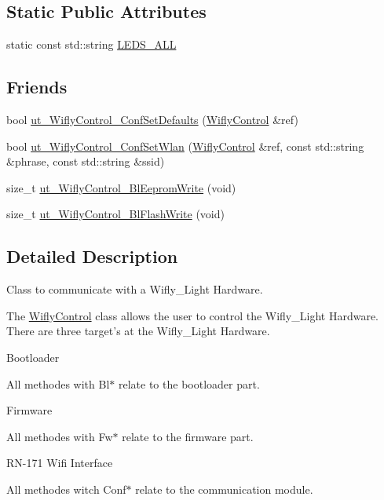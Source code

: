 \subsection*{Static Public Attributes}
\begin{DoxyCompactItemize}
\item 
static const std\-::string \hyperlink{class_wifly_control_a1fb5f6703533d3ccf68f6e474f51dbce}{L\-E\-D\-S\-\_\-\-A\-L\-L}
\end{DoxyCompactItemize}
\subsection*{Friends}
\begin{DoxyCompactItemize}
\item 
bool \hyperlink{class_wifly_control_a36b5c00f9f2f73e06cadae67312349b4}{ut\-\_\-\-Wifly\-Control\-\_\-\-Conf\-Set\-Defaults} (\hyperlink{class_wifly_control}{Wifly\-Control} \&ref)
\item 
bool \hyperlink{class_wifly_control_ad253e89bab564cf17fd5c8a9add65613}{ut\-\_\-\-Wifly\-Control\-\_\-\-Conf\-Set\-Wlan} (\hyperlink{class_wifly_control}{Wifly\-Control} \&ref, const std\-::string \&phrase, const std\-::string \&ssid)
\item 
size\-\_\-t \hyperlink{class_wifly_control_a327c95f9335fa4b257b064ef2e917a80}{ut\-\_\-\-Wifly\-Control\-\_\-\-Bl\-Eeprom\-Write} (void)
\item 
size\-\_\-t \hyperlink{class_wifly_control_a661b9ec8a685bc800221f2fd5d031a20}{ut\-\_\-\-Wifly\-Control\-\_\-\-Bl\-Flash\-Write} (void)
\end{DoxyCompactItemize}


\subsection{Detailed Description}
Class to communicate with a Wifly\-\_\-\-Light Hardware. 

The \hyperlink{class_wifly_control}{Wifly\-Control} class allows the user to control the Wifly\-\_\-\-Light Hardware. There are three target's at the Wifly\-\_\-\-Light Hardware.
\begin{DoxyItemize}
\item Bootloader\par
 All methodes with Bl$\ast$ relate to the bootloader part.
\item Firmware\par
 All methodes with Fw$\ast$ relate to the firmware part.
\item R\-N-\/171 Wifi Interface\par
 All methodes witch Conf$\ast$ relate to the communication module. 
\end{DoxyItemize}

